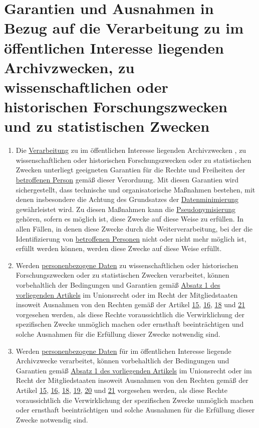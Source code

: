 \chapter{Garantien und Ausnahmen in Bezug auf die Verarbeitung zu im öffentlichen Interesse liegenden Archivzwecken, zu
 wissenschaftlichen oder historischen Forschungszwecken und zu statistischen Zwecken}
\label{ch:89}


\begin{enumerate}

  \item Die \hyperref[itm:04-2]{Verarbeitung} zu im öffentlichen Interesse liegenden Archivzwecken
   , zu wissenschaftlichen oder
    historischen Forschungszwecken oder zu statistischen Zwecken unterliegt geeigneten Garantien für die Rechte und
    Freiheiten der \hyperref[itm:04-1]{betroffenen Person} gemäß dieser Verordnung. Mit diesen Garantien wird
    sichergestellt, dass technische und organisatorische Maßnahmen bestehen, mit denen insbesondere die Achtung des
    Grundsatzes der \hyperref[itm:05-1c]{Datenminimierung} gewährleistet wird. Zu diesen Maßnahmen kann die \hyperref
    [itm:04-5]{Pseudonymisierung} gehören, sofern es möglich ist, diese Zwecke auf diese Weise zu erfüllen. In allen
    Fällen, in denen diese Zwecke durch die Weiterverarbeitung, bei der die Identifizierung von \hyperref[itm:04-1]
    {betroffenen Personen} nicht oder nicht mehr möglich ist, erfüllt werden können, werden diese Zwecke auf diese
    Weise erfüllt.%
  \label{itm:89-1}

  \item Werden \hyperref[itm:04-1]{personenbezogene Daten} zu wissenschaftlichen oder historischen Forschungszwecken
   oder zu statistischen Zwecken verarbeitet, können vorbehaltlich der Bedingungen und Garantien gemäß \hyperref
   [itm:89-1]{Absatz 1 des vorliegenden Artikels} im Unionsrecht oder im Recht der Mitgliedstaaten insoweit Ausnahmen
   von den Rechten gemäß der Artikel \hyperref[ch:15]{15}, \hyperref[ch:16]{16}, \hyperref[ch:18]{18} und \hyperref
   [ch:21]{21} vorgesehen werden, als diese Rechte voraussichtlich die Verwirklichung der spezifischen Zwecke unmöglich
   machen oder ernsthaft beeinträchtigen und solche Ausnahmen für die Erfüllung dieser Zwecke notwendig sind.%
  \label{itm:89-2}

  \item Werden \hyperref[itm:04-1]{personenbezogene Daten} für im öffentlichen Interesse liegende Archivzwecke
   verarbeitet, können vorbehaltlich der Bedingungen und Garantien gemäß \hyperref[itm:89-1]{Absatz 1 des vorliegenden
   Artikels} im Unionsrecht oder im Recht der Mitgliedstaaten insoweit Ausnahmen von den Rechten gemäß der
   Artikel \hyperref[ch:15]{15}, \hyperref[ch:16]{16}, \hyperref[ch:18]{18}, \hyperref[ch:19]{19}, \hyperref[ch:20]
   {20} und \hyperref[ch:21]{21} vorgesehen werden, als diese Rechte voraussichtlich die Verwirklichung der
   spezifischen Zwecke unmöglich machen oder ernsthaft beeinträchtigen und solche Ausnahmen für die Erfüllung dieser
   Zwecke notwendig sind.%
  \label{itm:89-3}


\end{enumerate}
